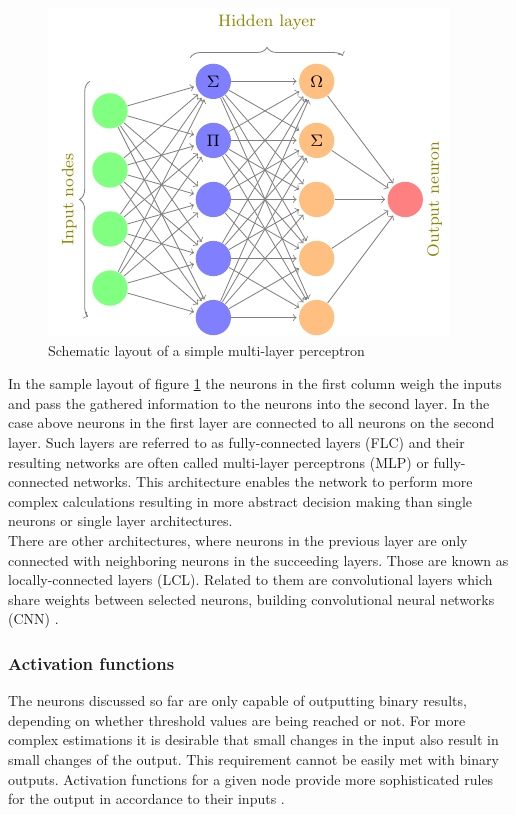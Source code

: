 \begin{figure}[H]
\centering
\includegraphics[height=.25\textheight, width=.5\textwidth]{Figures/neuralnet}
\decoRule
\caption[Schematic layout of a simple multi-layer perceptron]{Schematic layout of a simple multi-layer perceptron}
\label{fig:nn}
\end{figure}


In the sample layout of figure \ref{fig:nn} the neurons in the first column weigh the inputs and
pass the gathered information to the neurons into the second layer. In the case above neurons in the
first layer are connected to all neurons on the second layer. Such layers are referred to as
fully-connected layers (FLC) and their resulting networks are often called multi-layer perceptrons
(MLP) or fully-connected networks. This architecture enables the network to perform more complex
calculations resulting in more abstract decision
making than single neurons or single layer architectures.\\
There are other architectures, where neurons in the previous layer are only connected with
neighboring neurons in the succeeding layers. Those are known as locally-connected layers
(LCL). Related to them are convolutional layers which share weights between selected neurons,
building convolutional neural networks (CNN) \cite{lecun1999object}.

\subsubsection{Activation functions}

The neurons discussed so far are only capable of outputting binary results, depending on whether
threshold values are being reached or not. For more complex estimations it is desirable that small
changes in the input also result in small changes of the output. This requirement cannot be easily
met with binary outputs. Activation functions for a given node provide more sophisticated rules for
the output in accordance to their inputs \cite{vzilinskas2006practical}.

